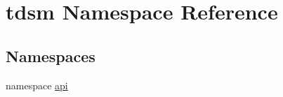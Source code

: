 \hypertarget{namespacetdsm}{}\section{tdsm Namespace Reference}
\label{namespacetdsm}
\subsection*{Namespaces}
\begin{DoxyCompactItemize}
\item 
namespace \hyperlink{namespacetdsm_1_1api}{api}
\end{DoxyCompactItemize}

